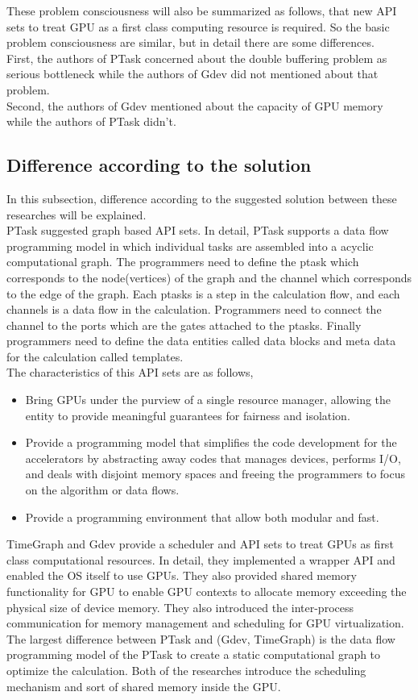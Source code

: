\documentclass[10pt,a4paper]{ltjsarticle}       %
\begin{document}
These problem consciousness will also be summarized as follows, that new API sets to treat GPU as a first class computing resource is required. So the basic problem consciousness are similar, but in detail there are some differences.\\
First, the authors of PTask concerned about the double buffering problem as serious bottleneck while the authors of Gdev did not mentioned about that problem.\\
Second, the authors of Gdev mentioned about the capacity of GPU memory while the authors of PTask didn't.\\ 
\subsection{Difference according to the solution}
In this subsection, difference according to the suggested solution between these researches will be explained.\\
PTask suggested graph based API sets. In detail, PTask supports a data flow programming model in which individual tasks are assembled into a acyclic computational graph. The programmers need to define the ptask which corresponds to the node(vertices) of the graph and the channel which corresponds to the edge of the graph. Each ptasks is a step in the calculation flow, and each channels is a data flow in the calculation. Programmers need to connect the channel to the ports which are the gates attached to the ptasks. Finally programmers need to define the data entities called data blocks and meta data for the calculation called templates.\\
The characteristics of this API sets are as follows,
\begin{itemize}
\item Bring GPUs under the purview of a single resource manager, allowing the entity to provide meaningful guarantees for fairness and isolation.
\item Provide a programming model that simplifies the code development for the accelerators by abstracting away codes that manages devices, performs I/O, and deals with disjoint memory spaces and freeing the programmers to focus on the algorithm or data flows.
\item Provide a programming environment that allow both modular and fast.
\end{itemize}
TimeGraph and Gdev provide a scheduler and API sets to treat GPUs as first class computational resources. In detail, they implemented a wrapper API and enabled the OS itself to use GPUs. They also provided shared memory functionality for GPU to enable GPU contexts to allocate memory exceeding the physical size of device memory. They also introduced the inter-process communication for memory management and scheduling for GPU virtualization.\\
The largest difference between PTask and (Gdev, TimeGraph) is the data flow programming model of the PTask to create a static computational graph to optimize the calculation. Both of the researches introduce the scheduling mechanism and sort of shared memory inside the GPU.
\end{document}
